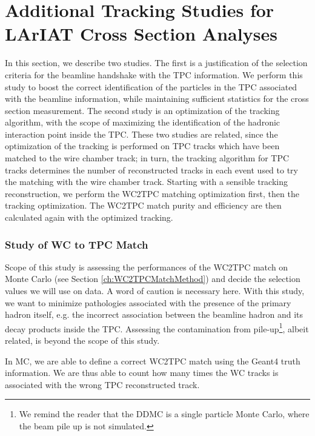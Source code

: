 \chapter{Additional Tracking Studies for LArIAT Cross Section Analyses}\label{ch:AppendixTrack}
In this section, we describe two studies. The first is a justification of the selection criteria for the beamline handshake with the TPC information.  We perform this study to boost  the correct identification of the particles in the TPC associated with the beamline information, while maintaining sufficient statistics for the cross section measurement.  The second study is an optimization of the tracking algorithm, with the scope of maximizing the identification of the hadronic interaction point inside the TPC.  These two studies are related, since the optimization of the tracking is performed on TPC tracks which have been matched to the wire chamber track; in turn, the tracking algorithm for TPC tracks determines the number of reconstructed tracks in each event used to try the matching with the wire chamber track. Starting with a sensible tracking reconstruction, we perform the WC2TPC matching optimization first, then the tracking optimization. The WC2TPC match purity and efficiency  are then calculated again with the optimized tracking.


\subsection{Study of WC to TPC Match}



Scope of this study is assessing the performances of the WC2TPC match on Monte Carlo (see Section \ref{ch:WC2TPCMatchMethod}) and decide the selection values we will use on data. A word of caution is necessary here. With this study, we want to minimize pathologies associated with the presence of the primary hadron itself, e.g. the incorrect association between the beamline hadron and its decay products inside the TPC.  Assessing the contamination from pile-up\footnote{We remind the reader that the DDMC is a single particle Monte Carlo, where the beam pile up is not simulated.}, albeit related, is beyond the scope of this study.

In MC, we are able to define a correct WC2TPC match using the Geant4 truth information. We are thus able to count how many times the WC tracks is associated with the wrong TPC reconstructed track. 

